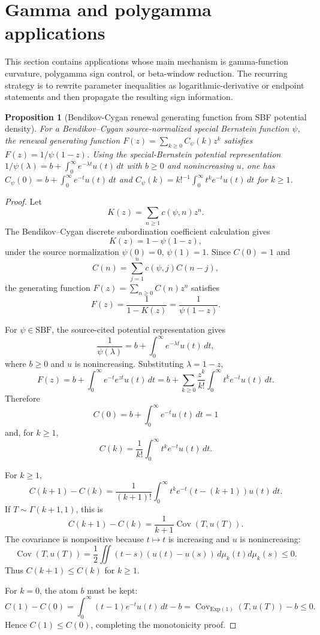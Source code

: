 \documentclass[11pt]{article}
\numberwithin{equation}{section}
\newtheorem{proposition}[theorem]{Proposition}
\theoremstyle{definition}
\theoremstyle{remark}
\newcommand{\1}{\mathbf 1}
\begin{document}
\section{Gamma and polygamma applications}
\label{sec:gamma-and-polygamma-applications}
This section contains applications whose main mechanism is gamma-function curvature, polygamma sign control, or beta-window reduction.  The recurring strategy is to rewrite parameter inequalities as logarithmic-derivative or endpoint statements and then propagate the resulting sign information.

\begin{proposition}[Bendikov-Cygan renewal generating function from SBF potential density]
\label{res:bendikovcygan-renewalgeneratingfunction-sbfpotential}
For a Bendikov--Cygan source-normalized special Bernstein function \(\psi\), the renewal generating function \(F(z)=\sum_{k\ge0}C_\psi(k)z^k\) satisfies \(F(z)=1/\psi(1-z)\). Using the special-Bernstein potential representation \(1/\psi(\lambda)=b+\int_0^\infty e^{-\lambda t}u(t)\,dt\) with \(b\ge0\) and nonincreasing \(u\), one has \(C_\psi(0)=b+\int_0^\infty e^{-t}u(t)\,dt\) and \(C_\psi(k)=k!^{-1}\int_0^\infty t^k e^{-t}u(t)\,dt\) for \(k\ge1\).
\end{proposition}

\begin{proof}
Let
\[
K(z)=\sum_{n\ge1}c(\psi,n)z^n.
\]
The Bendikov--Cygan discrete subordination coefficient calculation gives
\[
K(z)=1-\psi(1-z),
\]
under the source normalization \(\psi(0)=0\), \(\psi(1)=1\). Since \(C(0)=1\) and
\[
C(n)=\sum_{j=1}^{n}c(\psi,j)C(n-j),
\]
the generating function \(F(z)=\sum_{n\ge0}C(n)z^n\) satisfies
\[
F(z)=\frac{1}{1-K(z)}=\frac{1}{\psi(1-z)}.
\]

For \(\psi\in\mathrm{SBF}\), the source-cited potential representation gives
\[
\frac{1}{\psi(\lambda)}
=b+\int_0^\infty e^{-\lambda t}u(t)\,dt,
\]
where \(b\ge0\) and \(u\) is nonincreasing. Substituting \(\lambda=1-z\),
\[
F(z)=b+\int_0^\infty e^{-t}e^{zt}u(t)\,dt
=b+\sum_{k\ge0}\frac{z^k}{k!}\int_0^\infty t^k e^{-t}u(t)\,dt.
\]
Therefore
\[
C(0)=b+\int_0^\infty e^{-t}u(t)\,dt=1
\]
and, for \(k\ge1\),
\[
C(k)=\frac1{k!}\int_0^\infty t^k e^{-t}u(t)\,dt.
\]

For \(k\ge1\),
\[
C(k+1)-C(k)
=\frac1{(k+1)!}\int_0^\infty t^k e^{-t}(t-(k+1))u(t)\,dt.
\]
If \(T\sim\Gamma(k+1,1)\), this is
\[
C(k+1)-C(k)=\frac1{k+1}\operatorname{Cov}(T,u(T)).
\]
The covariance is nonpositive because \(t\mapsto t\) is increasing and \(u\) is nonincreasing:
\[
\operatorname{Cov}(T,u(T))
=\frac12\iint (t-s)(u(t)-u(s))\,d\mu_k(t)d\mu_k(s)\le0.
\]
Thus \(C(k+1)\le C(k)\) for \(k\ge1\).

For \(k=0\), the atom \(b\) must be kept:
\[
C(1)-C(0)
=\int_0^\infty (t-1)e^{-t}u(t)\,dt-b
=\operatorname{Cov}_{\mathrm{Exp}(1)}(T,u(T))-b\le0.
\]
Hence \(C(1)\le C(0)\), completing the monotonicity proof.
\end{proof}
\end{document}
